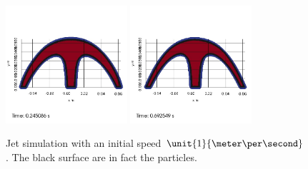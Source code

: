 \begin{figure}
\begin{center}
{}
\subcaptionbox{\label{top:jet:P:5}}
{
\includegraphics[width=0.4\textwidth]{topology/JetPetit/topo0004.jpg}
}
\subcaptionbox{\label{top:jet:P:6}}
{
\includegraphics[width=0.4\textwidth]{topology/JetPetit/topo0005.jpg}
}
\end{center}
\caption{Jet simulation with an initial speed $\unit{1}{\meter \per \second}$.
The black surface are in fact the particles.}
\label{top:jet:P}
\end{figure}

